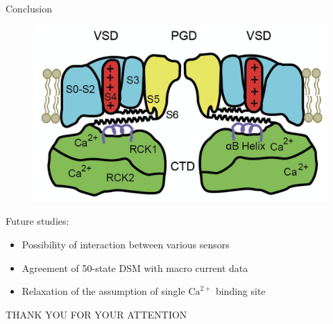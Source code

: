 \documentclass{beamer}
\newcommand{\ca}{\text{Ca}^{2+}}
\begin{document}
\begin{frame}{Conclusion}
\begin{figure}
\centering
\includegraphics[width=.5\textwidth]{BK_Cartoon.png}
\end{figure}

Future studies:
\begin{itemize}
	\item Possibility of interaction between various sensors
	\item Agreement of 50-state DSM with macro current data
	\item Relaxation of the assumption of single $\ca$ binding site
\end{itemize}

\end{frame}

\begin{frame}
\begin{center}
\huge{THANK YOU FOR YOUR ATTENTION}
\end{center}
\end{frame}

\end{document}
